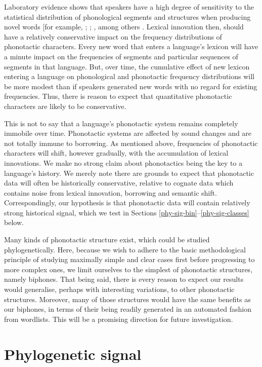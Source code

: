 Laboratory evidence shows that speakers have a high degree of sensitivity to the statistical distribution of phonological segments and structures when producing novel words {[}for example, \textcite{coleman_stochastic_1997}; \textcite{albright_rules_2003}; \textcite{hayes_stochastic_2006}, among others \autocite[see][pp.~20--21]{gordon_phonological_2016}. Lexical innovation then, should have a relatively conservative impact on the frequency distributions of phonotactic characters. Every new word that enters a language's lexicon will have a minute impact on the frequencies of segments and particular sequences of segments in that language. But, over time, the cumulative effect of new lexicon entering a language on phonological and phonotactic frequency distributions will be more modest than if speakers generated new words with no regard for existing frequencies. Thus, there is reason to expect that quantitative phonotactic characters are likely to be conservative.

This is not to say that a language's phonotactic system remains completely immobile over time. Phonotactic systems are affected by sound changes and are not totally immune to borrowing. As mentioned above, frequencies of phonotactic characters will shift, however gradually, with the accumulation of lexical innovations. We make no strong claim about phonotactics being the key to a language's history. We merely note there are grounds to expect that phonotactic data will often be historically conservative, relative to cognate data which contains noise from lexical innovation, borrowing and semantic shift. Correspondingly, our hypothesis is that phonotactic data will contain relatively strong historical signal, which we test in Sections \ref{phy-sig-bin}--\ref{phy-sig-classes} below.

Many kinds of phonotactic structure exist, which could be studied phylogenetically. Here, because we wish to adhere to the basic methodological principle of studying maximally simple and clear cases first before progressing to more complex ones, we limit ourselves to the simplest of phonotactic structures, namely biphones. That being said, there is every reason to expect our results would generalise, perhaps with interesting variations, to other phonotactic structures. Moreover, many of those structures would have the same benefits as our biphones, in terms of their being readily generated in an automated fashion from wordlists. This will be a promising direction for future investigation.

\hypertarget{phylo-sig}{%
\section{Phylogenetic signal}\label{phylo-sig}}

